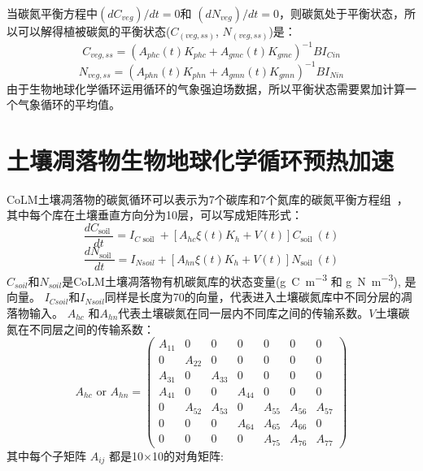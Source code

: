 当碳氮平衡方程中$(dC_{veg})/dt=0$和 $(dN_{veg})/dt=0$，则碳氮处于平衡状态，所以可以解得植被碳氮的平衡状态($C_{(veg,ss)}$, $N_{(veg,ss)}$)是：
\begin{equation}
C_{veg, s s}=\left(A_{p h c}(t) K_{p h c}+A_{gmc}(t) K_{gmc}\right)^{-1} B I_{{Cin }}
\end{equation}
\begin{equation}
N_{veg, s s}=\left(A_{phn}(t) K_{phn}+A_{gmn}(t) K_{gmn}\right)^{-1} B I_{Nin}
\end{equation}
由于生物地球化学循环运用循环的气象强迫场数据，所以平衡状态需要累加计算一个气象循环的平均值。


\section{土壤凋落物生物地球化学循环预热加速}
CoLM土壤凋落物的碳氮循环可以表示为7个碳库和7个氮库的碳氮平衡方程组~\citep{lu2020full}，其中每个库在土壤垂直方向分为10层，可以写成矩阵形式：
\begin{equation}
\frac{d C_{\text {soil }}}{dt}=I_{C \text { soil }}+\left[A_{h c} \xi(t) K_{h}+V(t)\right] C_{\text {soil }}(t)
\end{equation}
\begin{equation}
\frac{d N_{\text {soil }}}{dt}=I_{N s o i l}+\left[A_{h n} \xi(t) K_{h}+V(t)\right] N_{\text {soil }}(t)
\end{equation}
$C_{soil}$和$N_{soil}$是CoLM土壤凋落物有机碳氮库的状态变量(\unit{g.C.m^{-3}} 和 \unit{g.N.m^{-3}}), 是向量。
$I_{Csoil}$和$I_{Nsoil}$同样是长度为70的向量，代表进入土壤碳氮库中不同分层的凋落物输入。
 $A_{hc}$ 和$A_{hn}$代表土壤碳氮在同一层内不同库之间的传输系数。$V$土壤碳氮在不同层之间的传输系数：
\begin{equation}
A_{h c} \text { or } A_{h n}=\left(\begin{array}{ccccccc}
  A_{11} & 0 & 0 & 0 & 0 & 0 & 0 \\ 
  0 & A_{22} & 0 & 0 & 0 & 0 & 0 \\
  A_{31} & 0 & A_{33} & 0 & 0 & 0 & 0 \\
  A_{41} & 0 & 0 & A_{44} & 0 & 0 & 0 \\
  0 & A_{52} & A_{53} & 0 & A_{55} & A_{56} & A_{57} \\
  0 & 0 & 0 & A_{64} & A_{65} & A_{66} & 0 \\ 
  0 & 0 & 0 & 0 & A_{75} & A_{76} & A_{77}\end{array}\right)
\end{equation}
其中每个子矩阵 $A_{ij}$ 都是10$\times$10的对角矩阵:  

